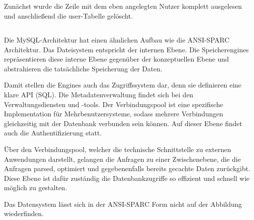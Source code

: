 \documentclass[ngerman]{gdb-aufgabenblatt}
\begin{document}
	\subsection{} %
		Zunächst wurde die Zeile mit dem eben angelegten Nutzer komplett ausgelesen und anschließend die user-Tabelle gelöscht.
	\subsection{} %
		Die MySQL-Architektur hat einen ähnlichen Aufbau wie die ANSI-SPARC Architektur. Das Dateisystem entspricht der internen Ebene. Die Speicherengines repräsentieren diese interne Ebene gegenüber der konzeptuellen Ebene und abstrahieren die tatsächliche Speicherung der Daten. 
		
		Damit stellen die Engines auch das Zugriffssystem dar, denn sie definieren eine klare API (SQL). Die Metadatenverwaltung findet sich bei den Verwaltungsdiensten und -tools. Der Verbindungspool ist eine spezifische Implementation für Mehrbenutzersysteme, sodass mehrere Verbindungen gleichzeitig mit der Datenbank verbunden sein können. Auf dieser Ebene findet auch die Authentifizierung statt.
		
		Über den Verbindungspool, welcher die technische Schnittstelle zu externen Anwendungen darstellt, gelangen die Anfragen zu einer Zwischenebene, die die Anfragen parsed, optimiert und gegebenenfalls bereits gecachte Daten zurückgibt. Diese Ebene ist dafür zuständig die Datenbankzugriffe so effizient und schnell wie möglich zu gestalten.
		
		Das Datensystem lässt sich in der ANSI-SPARC Form nicht auf der Abbildung wiederfinden.
\end{document}
